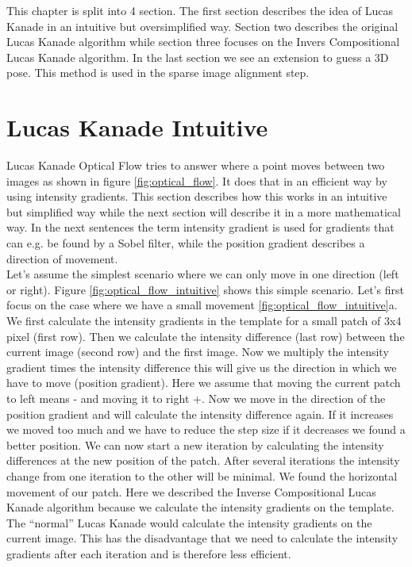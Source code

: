 \documentclass[11pt,a4paper,titlepage,oneside]{report}
\begin{document}
This chapter is split into 4 section. The first section describes the idea of Lucas Kanade in an intuitive but oversimplified way. Section two describes the original Lucas Kanade algorithm while section three focuses on the Invers Compositional Lucas Kanade algorithm. In the last section we see an extension to guess a 3D pose. This method is used in the sparse image alignment step.

\section{Lucas Kanade Intuitive}

Lucas Kanade Optical Flow tries to answer where a point moves between two images as shown in figure \ref{fig:optical_flow}. It does that in an efficient way by using intensity gradients. This section describes how this works in an intuitive but simplified way while the next section will describe it in a more mathematical way. In the next sentences the term intensity gradient is used for gradients that can e.g. be found by a Sobel filter, while the position gradient describes a direction of movement. \\
Let's assume the simplest scenario where we can only move in one direction (left or right). Figure \ref{fig:optical_flow_intuitive} shows this simple scenario. Let's first focus on the case where we have a small movement \ref{fig:optical_flow_intuitive}a. We first calculate the intensity gradients in the template for a small patch of 3x4 pixel (first row). Then we calculate the intensity difference (last row) between the current image (second row) and the first image. Now we multiply the intensity gradient times the intensity difference this will give us the direction in which we have to move (position gradient). Here we assume that moving the current patch to left means - and moving it to right +. Now we move in the direction of the position gradient and will calculate the intensity difference again. If it increases we moved too much and we have to reduce the step size if it decreases we found a better position. We can now start a new iteration by calculating the intensity differences at the new position of the patch. After several iterations the intensity change from one iteration to the other will be minimal. We found the horizontal movement of our patch. Here we described the Inverse Compositional Lucas Kanade algorithm because we calculate the intensity gradients on the template. The ``normal'' Lucas Kanade would calculate the intensity gradients on the current image. This has the disadvantage that we need to calculate the intensity gradients after each iteration and is therefore less efficient.\\
\end{document}
